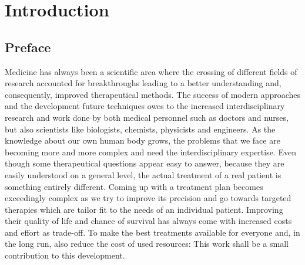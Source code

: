 
\chapter{Introduction}
\label{chap:intro}


\section{Preface}

Medicine has always been a scientific area where the crossing of different fields of research accounted for breakthroughs leading to a better understanding and, consequently, improved therapeutical methods.
The success of modern approaches and the development future techniques owes to the increased interdisciplinary research and work done by both medical personnel such as doctors and nurses, but also scientists like biologists, chemists, physicists and engineers.
As the knowledge about our own human body grows, the problems that we face are becoming more and more complex and need the interdisciplinary expertise.
Even though some therapeutical questions appear easy to answer, because they are easily understood on a general level, the actual treatment of a real patient is something entirely different.
Coming up with a treatment plan becomes exceedingly complex as we try to improve its precision and go towards targeted therapies which are tailor fit to the needs of an individual patient.
Improving their quality of life and chance of survival has always come with increased costs and effort as trade-off.
To make the best treatments available for everyone and, in the long run, also reduce the cost of used resources:
This work shall be a small contribution to this development.
\newpage


